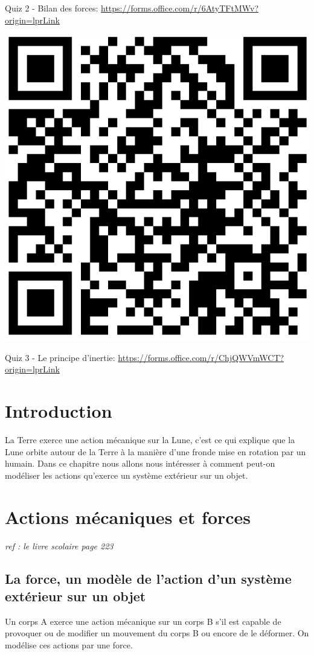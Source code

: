 \documentclass[french, a4paper, 12pt, twocolumn, landscape]{article}
\begin{document}
\begin{center}
\begin{minipage}{.12\textwidth}
		Quiz 2 - Bilan des forces: \url{https://forms.office.com/r/6AtyTFtMWv?origin=lprLink}
	\end{minipage}\hspace{.5cm}
\begin{minipage}{.12\textwidth}
			\centering
			\includegraphics[width=.5\textwidth]{Quiz3.png}
	
			Quiz 3 - Le principe d'inertie: \url{https://forms.office.com/r/ChjQWVmWCT?origin=lprLink}
		\end{minipage}
\end{center}

\section*{Introduction}


La Terre exerce une action mécanique sur la Lune, c'est ce qui explique que la Lune orbite autour de la Terre à la manière d'une fronde mise en rotation par un humain. Dans ce chapitre nous allons nous intéresser à comment peut-on modéliser les actions qu'exerce un système extérieur sur un objet. 


\section{Actions mécaniques et forces} 

\begin{center}
	\textit{ref : le livre scolaire page 223}
\end{center}

\subsection{La force, un modèle de l'action d'un système extérieur sur un objet}

Un corps A exerce une action mécanique sur un corps B s'il est capable de provoquer ou de modifier un mouvement du corps B ou encore de le déformer. On modélise ces actions par une force.
\end{document}
